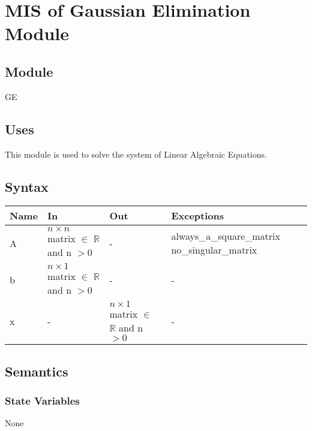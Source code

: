 \documentclass[12pt, titlepage]{article}
\begin{document}
\newpage


\section{MIS of {Gaussian Elimination  Module}} \label{modge}

\subsection{Module}

GE


\subsection{Uses}
This module is used to solve the system of Linear Algebraic Equations.


\subsection{Syntax}

\begin{center}
\begin{tabular}{p{2cm} p{4cm} p{4cm} p{2cm}}
\hline
\textbf{Name} & \textbf{In} & \textbf{Out} & \textbf{Exceptions} \\
\hline

A & $n \times n$ matrix $\in$ $\mathbb{R}$ and n $> 0$ & - & always\_a\_square\_matrix no\_singular\_matrix\\
b & $n \times 1$ matrix $\in$ $\mathbb{R}$ and n $> 0$ & - & - \\
x & - & $n \times 1$ matrix $\in$ $\mathbb{R}$ and n $> 0$ & - \\
\hline
\end{tabular}
\end{center}


\subsection{Semantics}

\subsubsection{State Variables}

None
\end{document}
